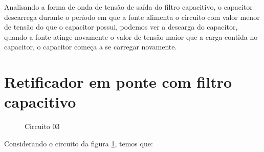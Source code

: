 Analisando a forma de onda de tensão de saída do filtro capacitivo, o capacitor descarrega durante o período em que a fonte alimenta o circuito com valor menor de tensão do que o capacitor possui, podemos ver a descarga do capacitor, quando a fonte atinge novamente o valor de tensão maior que a carga contida no capacitor, o capacitor começa a se carregar novamente.

\section{Retificador em ponte com filtro capacitivo}

\begin{figure}[H]
    \centering
    \caption{Circuito 03}
    \vspace{-0.3cm}
    \label{fig:Circuito03}
\end{figure}

Considerando o circuito da figura \ref{fig:Circuito03}, temos que:

\begin{Resolucao}[H]
    \label{res:circuito03}
\end{Resolucao}

